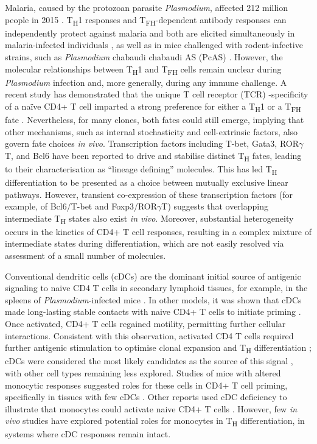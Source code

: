 Malaria, caused by the protozoan parasite \textit{Plasmodium}, affected 212 million people in 2015 \cite{Organization2016-tj}. T\textsubscript{H}1 responses \cite{Pinzon-Charry2010-zk} and T\textsubscript{FH}-dependent antibody responses \cite{Boyle2015-yg} can independently protect against malaria and both are elicited simultaneously in malaria-infected individuals \cite{Obeng-Adjei2015-dc}, as well as in mice challenged with rodent-infective strains, such as \textit{Plasmodium} chabaudi chabaudi AS (PcAS) \cite{Perez-Mazliah2014-cq}. However, the molecular relationships between T\textsubscript{H}1 and T\textsubscript{FH} cells remain unclear during \textit{Plasmodium} infection and, more generally, during any immune challenge. A recent study has demonstrated that the unique T cell receptor (TCR) -specificity of a na\"{i}ve CD4+ T cell imparted a strong preference for either a T\textsubscript{H}1 or a T\textsubscript{FH} fate \cite{Tubo2013-zg}. Nevertheless, for many clones, both fates could still emerge, implying that other mechanisms, such as internal stochasticity and cell-extrinsic factors, also govern fate choices \textit{in vivo}. Transcription factors including T-bet, Gata3, ROR\( \gamma \)T, and Bcl6 have been reported to drive and stabilise distinct T\textsubscript{H} fates, leading to their characterisation as “lineage defining” molecules. This has led T\textsubscript{H} differentiation to be presented as a choice between mutually exclusive linear pathways. However, transient co-expression of these transcription factors (for example, of Bcl6/T-bet and Foxp3/ROR\( \gamma \)T) suggests that overlapping intermediate T\textsubscript{H} states also exist \textit{in vivo}. Moreover, substantial heterogeneity occurs in the kinetics of CD4+ T cell responses, resulting in a complex mixture of intermediate states during differentiation, which are not easily resolved via assessment of a small number of molecules.

Conventional dendritic cells (cDCs) are the dominant initial source of antigenic signaling to naive CD4 T cells in secondary lymphoid tissues, for example, in the spleens of \textit{Plasmodium}-infected mice \cite{DeWalick2007-mu}. In other models, it was shown that cDCs made long-lasting stable contacts with naive CD4+ T cells to initiate priming \cite{Celli2007-dp}. Once activated, CD4+ T cells regained motility, permitting further cellular interactions. Consistent with this observation, activated CD4 T cells required further antigenic stimulation to optimise clonal expansion and T\textsubscript{H} differentiation \cite{Bajenoff2002-om}; cDCs were considered the most likely candidates as the source of this signal \cite{Celli2007-dp, Groom2012-az}, with other cell types remaining less explored. Studies of mice with altered monocytic responses suggested roles for these cells in CD4+ T cell priming, specifically in tissues with few cDCs \cite{Hohl2009-wg}. Other reports used cDC deficiency to illustrate that monocytes could activate naive CD4+ T cells \cite{Nakano2009-rg}. However, few \textit{in vivo} studies have explored potential roles for monocytes in T\textsubscript{H} differentiation, in systems where cDC responses remain intact.

